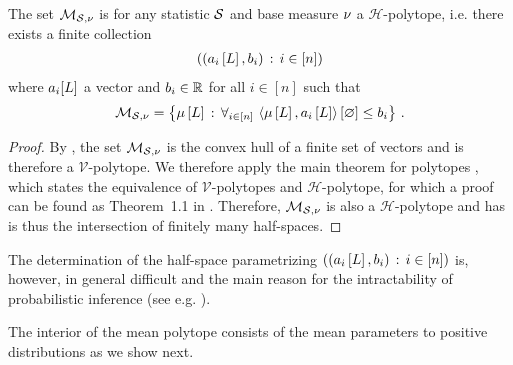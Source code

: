 \begin{theorem}
    \label{the:meanPolytopeHalfspaces}
    The set $\mathcal{M}_{\mathcal{S},\nu}$ is for any statistic $\mathcal{S}$ and base measure $\nu$ a $\mathcal{H}$-polytope, i.e. there exists a finite collection
    \begin{align*}
        \left( (a_{i}\left[L\right],b_{i}) \, : \, i \in[n]\right)
    \end{align*}
    where $a_i[L]$ a vector and $b_i\in\mathbb{R}$ for all $i\in[n]$ such that
    \begin{align*}
        \mathcal{M}_{\mathcal{S},\nu}
        = \left\{\mu\left[L\right] \,:\,\forall_{i\in[n]} \, \left\langle \mu\left[L\right],a_{i}\left[L\right]\right\rangle \left[ \varnothing \right]\leq b_{i} \right\} \, .
    \end{align*}
\end{theorem}
\begin{proof}
    By , the set $\mathcal{M}_{\mathcal{S},\nu}$ is the convex hull of a finite set of vectors and is therefore a $\mathcal{V}$-polytope.
    We therefore apply the main theorem for polytopes \cite{motzkin_beitrage_1936}, which states the equivalence of $\mathcal{V}$-polytopes and $\mathcal{H}$-polytope, for which a proof can be found as Theorem~1.1 in \cite{ziegler_lectures_2013}.
    Therefore, $\mathcal{M}_{\mathcal{S},\nu}$ is also a $\mathcal{H}$-polytope and has is thus the intersection of finitely many half-spaces.
\end{proof}

The determination of the half-space parametrizing $\left( (a_{i}\left[L\right],b_{i}) \, : \, i \in[n]\right)$ is, however, in general difficult and the main reason for the intractability of probabilistic inference (see e.g. \cite{wainwright_graphical_2008}).



The interior of the mean polytope consists of the mean parameters to positive distributions as we show next.

